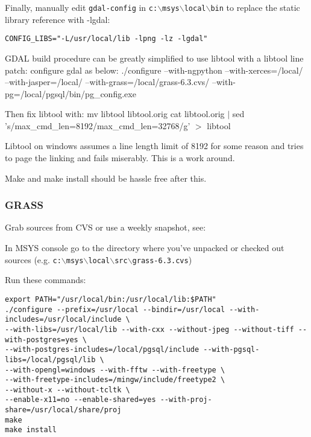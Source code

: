 Finally, manually edit \texttt{gdal-config} in \texttt{c:$\backslash$msys$\backslash$local$\backslash$bin} to replace the static library reference with -lgdal:

\begin{verbatim}
CONFIG_LIBS="-L/usr/local/lib -lpng -lz -lgdal"
\end{verbatim}
GDAL build procedure can be greatly simplified to use libtool with a libtool line patch:
configure gdal as below:
./configure --with-ngpython --with-xerces=/local/ --with-jasper=/local/ --with-grass=/local/grass-6.3.cvs/ --with-pg=/local/pgsql/bin/pg\_config.exe 

Then fix libtool with:
mv libtool libtool.orig
cat libtool.orig $|$ sed 's/max\_cmd\_len=8192/max\_cmd\_len=32768/g' $>$ libtool

Libtool on windows assumes a line length limit of 8192 for some reason and tries to page the linking and fails miserably. This is a work around.

Make and make install should be hassle free after this.

\subsubsection{GRASS}
Grab sources from CVS or use a weekly snapshot, see:

	\begin{quotation}
	\end{quotation}

In MSYS console go to the directory where you've unpacked or checked out sources
(e.g. \texttt{c:$\backslash$msys$\backslash$local$\backslash$src$\backslash$grass-6.3.cvs})

Run these commands:

\begin{verbatim}
export PATH="/usr/local/bin:/usr/local/lib:$PATH"
./configure --prefix=/usr/local --bindir=/usr/local --with-includes=/usr/local/include \
--with-libs=/usr/local/lib --with-cxx --without-jpeg --without-tiff --with-postgres=yes \
--with-postgres-includes=/local/pgsql/include --with-pgsql-libs=/local/pgsql/lib \
--with-opengl=windows --with-fftw --with-freetype \
--with-freetype-includes=/mingw/include/freetype2 \
--without-x --without-tcltk \
--enable-x11=no --enable-shared=yes --with-proj-share=/usr/local/share/proj
make
make install
\end{verbatim}

